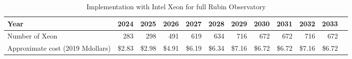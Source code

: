 \tiny \begin{longtable} { |p{}  |r  |r  |r  |r  |r  |r  |r  |r  |r  |r  |r |} 
\caption{Implementation with Intel Xeon for full Rubin Observatory \label{tab:opsXeon}}\\ 
\hline 
\textbf{Year}&\textbf{2024}&\textbf{2025}&\textbf{2026}&\textbf{2027}&\textbf{2028}&\textbf{2029}&\textbf{2030}&\textbf{2031}&\textbf{2032}&\textbf{2033} \\ \hline
{Number of Xeon}&{283}&{298}&{491}&{619}&{634}&{716}&{672}&{672}&{716}&{672} \\ \hline
{Approximate cost (2019 Mdollars)}&{\$2.83}&{\$2.98}&{\$4.91}&{\$6.19}&{\$6.34}&{\$7.16}&{\$6.72}&{\$6.72}&{\$7.16}&{\$6.72} \\ \hline
\end{longtable} \normalsize
